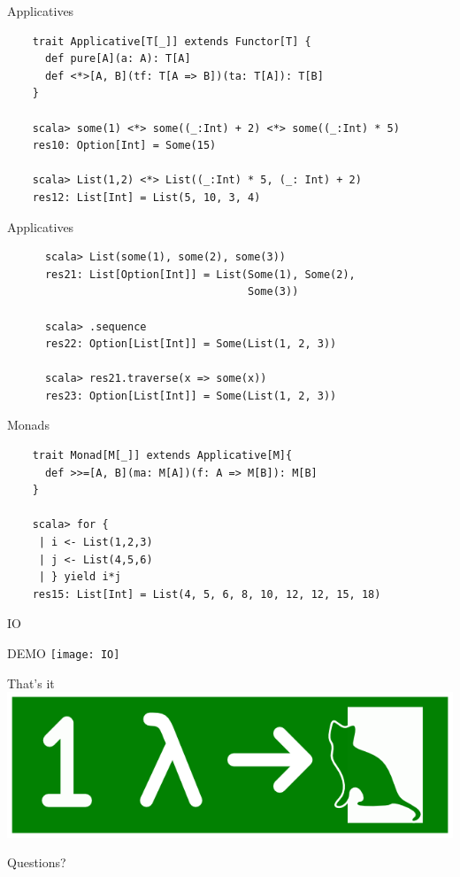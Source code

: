 \documentclass{beamer}
\begin{document}
\begin{frame}[fragile]{Applicatives}
    \begin{verbatim}
    trait Applicative[T[_]] extends Functor[T] {
      def pure[A](a: A): T[A]
      def <*>[A, B](tf: T[A => B])(ta: T[A]): T[B]
    }

    scala> some(1) <*> some((_:Int) + 2) <*> some((_:Int) * 5)
    res10: Option[Int] = Some(15)

    scala> List(1,2) <*> List((_:Int) * 5, (_: Int) + 2)
    res12: List[Int] = List(5, 10, 3, 4)
  \end{verbatim}
\end{frame}

\begin{frame}[fragile]{Applicatives}
    \begin{verbatim}
      scala> List(some(1), some(2), some(3))
      res21: List[Option[Int]] = List(Some(1), Some(2),
                                      Some(3))

      scala> .sequence
      res22: Option[List[Int]] = Some(List(1, 2, 3))

      scala> res21.traverse(x => some(x))
      res23: Option[List[Int]] = Some(List(1, 2, 3))
  \end{verbatim}
\end{frame}

\begin{frame}[fragile]{Monads}
  \begin{verbatim}
    trait Monad[M[_]] extends Applicative[M]{
      def >>=[A, B](ma: M[A])(f: A => M[B]): M[B]
    }

    scala> for {
     | i <- List(1,2,3)
     | j <- List(4,5,6)
     | } yield i*j
    res15: List[Int] = List(4, 5, 6, 8, 10, 12, 12, 15, 18)
  \end{verbatim}
\end{frame}

\begin{frame}[fragile]{IO}
  \begin{center}
    {\Huge DEMO }\newline
    \texttt{[image: IO]}
  \end{center}
\end{frame}

\begin{frame}{That's it}
  \includegraphics[scale=0.4]{escape}\newline
  \Huge \centerline{Questions?}
\end{frame}
\end{document}
